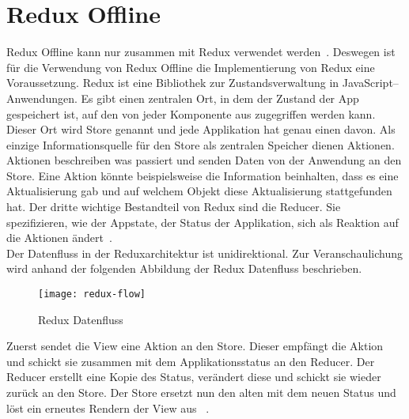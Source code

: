\section{\label{sub:reduxoffline}Redux Offline}
Redux Offline kann nur zusammen mit Redux verwendet werden~\cite{redux-req}.
Deswegen ist für die Verwendung von Redux Offline die Implementierung von Redux eine Voraussetzung.
%
%
Redux ist eine Bibliothek zur Zustandsverwaltung in JavaScript--Anwendungen.
Es gibt einen zentralen Ort, in dem der Zustand der App gespeichert ist, auf den von jeder Komponente aus zugegriffen werden kann.
Dieser Ort wird Store genannt und jede Applikation hat genau einen davon. 
Als einzige Informationsquelle für den Store als zentralen Speicher dienen Aktionen. 
Aktionen beschreiben was passiert und senden Daten von der Anwendung an den Store.
Eine Aktion könnte beispielsweise die Information beinhalten, dass es eine Aktualisierung gab und auf welchem Objekt diese Aktualisierung stattgefunden hat.
Der dritte wichtige Bestandteil von Redux sind die Reducer. Sie spezifizieren, wie der \gls{App}state, der Status der Applikation, sich als Reaktion auf die Aktionen ändert~\cite{redux}.\\
Der Datenfluss in der Reduxarchitektur ist unidirektional. Zur Veranschaulichung wird anhand der folgenden Abbildung der Redux Datenfluss beschrieben.
%
\begin{figure}[H]
  \centering
  \texttt{[image: redux-flow]}
  \grayRule
  \caption{Redux Datenfluss}
  \label{fig:rdx-dataflow}
\end{figure}
% 
Zuerst sendet die View eine Aktion an den Store. Dieser empfängt die Aktion und schickt sie zusammen mit dem Applikationsstatus an den Reducer.
Der Reducer erstellt eine Kopie des Status, verändert diese und schickt sie wieder zurück an den Store.
Der Store ersetzt nun den alten mit dem neuen Status und löst ein erneutes Rendern der View aus ~\cite{reduxflow}.
